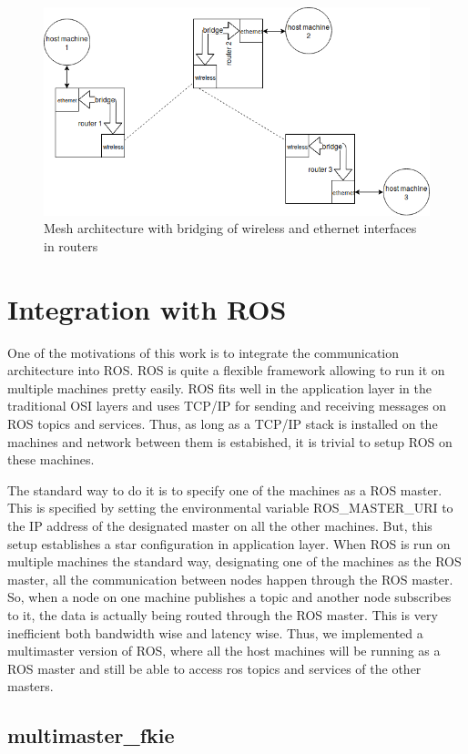 \begin{figure}[h]
	\centering
	\includegraphics[scale=0.7]{Pictures/meshNetwork.png}
	\caption{Mesh architecture with bridging of wireless and ethernet interfaces in routers}
	\label{fig: meshNetwork}
\end{figure}

\section{Integration with ROS}
One of the motivations of this work is to integrate the communication architecture into ROS. ROS is quite a flexible framework allowing to run it on multiple machines pretty easily. ROS fits well in the application layer in the traditional OSI layers and uses TCP/IP for sending and receiving messages on ROS topics and services. Thus, as long as a TCP/IP stack is installed on the machines and network between them is estabished, it is trivial to setup ROS on these machines.

The standard way to do it is to specify one of the machines as a ROS master. This is specified by setting the environmental variable ROS\_MASTER\_URI to the IP address of the designated master on all the other machines. But, this setup establishes a star configuration in application layer. When ROS is run on multiple machines the standard way, designating one of the machines as the ROS master, all the communication between nodes happen through the ROS master. So, when a node on one machine publishes a topic and another node subscribes to it, the data is actually being routed through the ROS master. This is very inefficient both bandwidth wise and latency wise. Thus, we implemented a multimaster version of ROS, where all the host machines will be running as a ROS master and still be able to access ros topics and services of the other masters.

\subsection{multimaster\_fkie}




